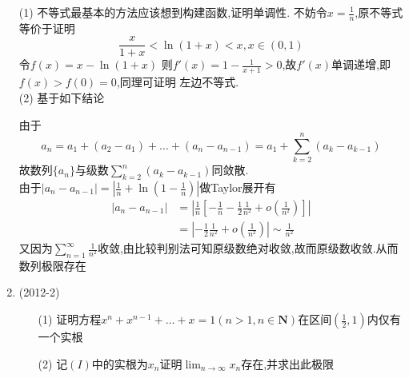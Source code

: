 \documentclass[12pt, a4paper, oneside, UTF8]{ctexbook}
\begin{document}
\begin{enumerate}
{        \begin{solution}[收敛级数]
            (1) 不等式最基本的方法应该想到构建函数,证明单调性. 不妨令$x=\frac{1}{n}$,原不等式等价于证明
            $$
            \frac{x}{1+x} < \ln{(1+x)} < x, x\in(0,1)
            $$
            令$f(x) = x - \ln(1+x)$ 则$f'(x)=1-\frac{1}{x+1} > 0$,故$f'(x)$单调递增,即$f(x)>f(0) = 0$,同理可证明
            左边不等式. \\
            (2) 基于如下结论
            \begin{center}
            \end{center}
            由于
            $$
            a_n = a_1 + (a_2 - a_1) + \ldots + (a_n - a_{n-1}) = a_1 + \sum_{k=2}^{n}(a_k-a_{k-1})
            $$
            故数列$\{a_n\}$与级数$\sum_{k=2}^{n}(a_k-a_{k-1})$同敛散. \\
            由于$\left|a_n-a_{n-1}\right| = \left|\frac{1}{n}+\ln\left(1-\frac{1}{n}\right)\right|$做Taylor展开有 
            \begin{align*}
                \left|a_n-a_{n-1}\right| &= \left|\frac{1}{n}\left[-\frac{1}{n}-\frac{1}{2}\frac{1}{n^2}+o(\frac{1}{n^2})\right]\right| \\
                &=\left|-\frac{1}{2}\frac{1}{n^2}+o(\frac{1}{n^2})\right| \sim \frac{1}{n^2}
            \end{align*}
            又因为$\sum_{n=1}^{\infty}\frac{1}{n^2}$收敛,由比较判别法可知原级数绝对收敛,故而原级数收敛.从而数列极限存在
        \end{solution}
    }
    \item (2012-2) \bt 
    \begin{enumerate}
        \item [(1)] 证明方程$x^{n}+x^{n-1}+\ldots+x=1(n>1,n\in\mathbf{N})$在区间$\left(\frac{1}{2},1\right)$内仅有一个实根 
        \item [(2)] 记$(I)$中的实根为$x_n$证明$ \lim_{n\to\infty}x_n$存在,并求出此极限 
    \end{enumerate}


\end{enumerate}
\end{document}
